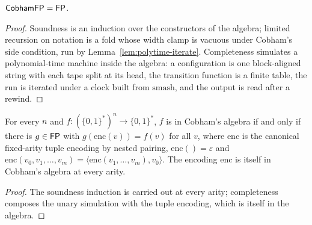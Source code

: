 \begin{theorem}[Cobham]
  \label{thm:cobham}
  \leanok
  $\mathsf{CobhamFP} = \mathsf{FP}$.
\end{theorem}
\begin{proof}
  \leanok
  Soundness is an induction over the constructors of the algebra; limited
  recursion on notation is a fold whose width clamp is vacuous under Cobham's
  side condition, run by Lemma~\ref{lem:polytime-iterate}. Completeness
  simulates a polynomial-time machine inside the algebra: a configuration is
  one block-aligned string with each tape split at its head, the transition
  function is a finite table, the run is iterated under a clock built from
  $\mathrm{smash}$, and the output is read after a rewind.
\end{proof}

\begin{theorem}
  \label{thm:polytime-cobham-arity}
  \leanok
  For every $n$ and $f \colon (\{0,1\}^*)^n \to \{0,1\}^*$, $f$ is in Cobham's
  algebra if and only if there is $g \in \mathsf{FP}$ with
  $g(\mathrm{enc}(v)) = f(v)$ for all $v$, where $\mathrm{enc}$ is the
  canonical fixed-arity tuple encoding by nested pairing,
  $\mathrm{enc}() = \varepsilon$ and
  $\mathrm{enc}(v_0, v_1, \ldots, v_m) = \langle \mathrm{enc}(v_1, \ldots,
  v_m), v_0 \rangle$. The encoding $\mathrm{enc}$ is itself in Cobham's
  algebra at every arity.
\end{theorem}
\begin{proof}
  \leanok
  The soundness induction is carried out at every arity; completeness
  composes the unary simulation with the tuple encoding, which is itself in
  the algebra.
\end{proof}

